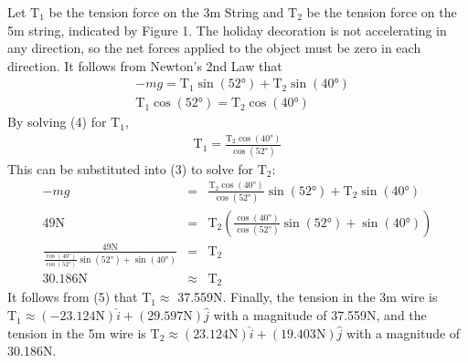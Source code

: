 \documentclass[12]{article}
\begin{document}
Let $\mathrm{T}_1$ be the tension force on the 3m String and $\mathrm{T}_2$ be the tension force on the 5m string, indicated by Figure 1. The holiday decoration is not accelerating in any direction, so the net forces applied to the object must be zero in each direction. It follows from Newton's 2nd Law that
\begin{eqnarray}
&-mg = \mathrm{T}_1 \sin{(\ang{52})} + \mathrm{T}_2 \sin{(\ang{40})}\\
&\mathrm{T}_1 \cos{(\ang{52})} = \mathrm{T}_2 \cos{(\ang{40})}
\end{eqnarray}
By solving (4) for $\mathrm{T}_1$,
\begin{eqnarray}
\mathrm{T}_1 = \frac{\mathrm{T}_2 \cos{(\ang{40})}}{\cos{(\ang{52})}}
\end{eqnarray}
This can be substituted into (3) to solve for $\mathrm{T}_2$:
\begin{eqnarray}
-mg &=& \frac{\mathrm{T}_2 \cos{(\ang{40})}}{\cos{(\ang{52})}}\sin{(\ang{52})} + \mathrm{T}_2 \sin{(\ang{40})}\\
49\mathrm{N} &=& \mathrm{T}_2 \left( \frac{\cos{(\ang{40})}}{\cos{(\ang{52})}}\sin{(\ang{52})} + \sin{(\ang{40})} \right)\\
\frac{49\mathrm{N}}{\frac{\cos{(\ang{40})}}{\cos{(\ang{52})}}\sin{(\ang{52})} + \sin{(\ang{40})}} &=& \mathrm{T}_2\\
30.186\mathrm{N} &\approx & \mathrm{T}_2
\end{eqnarray}
It follows from (5) that $\mathrm{T}_1 \approx$ 37.559N. Finally, the tension in the 3m wire is $\mathrm{T}_1 \approx (-23.124\mathrm{N})\hat{i} + (29.597\mathrm{N})\hat{j}$ with a magnitude of 37.559N, and the tension in the 5m wire is $\mathrm{T}_2 \approx (23.124\mathrm{N})\hat{i} + (19.403\mathrm{N})\hat{j}$ with a magnitude of 30.186N.
\end{document}
